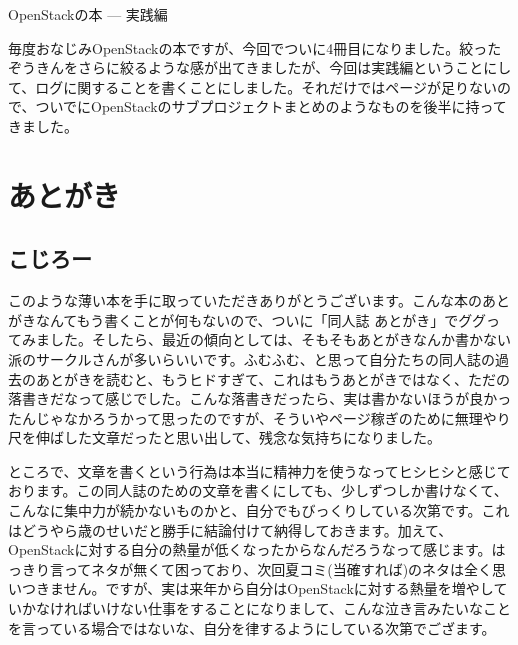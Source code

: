 \documentclass[10pt,b5paper,openany]{jsbook}
\begin{document}
{\Huge OpenStackの本 --- 実践編}

\vspace*{10mm}
\begin{minipage}{0.5\textwidth}
	{\scriptsize 毎度おなじみOpenStackの本ですが、今回でついに4冊目になりました。絞ったぞうきんをさらに絞るような感が出てきましたが、今回は実践編ということにして、ログに関することを書くことにしました。それだけではページが足りないので、ついでにOpenStackのサブプロジェクトまとめのようなものを後半に持ってきました。}
\end{minipage}

\vspace*{-1truein}
\begin{minipage}{\textwidth}
	\tableofcontents
\end{minipage}

\thispagestyle{empty}





\chapter{あとがき}

\section*{こじろー}
このような薄い本を手に取っていただきありがとうございます。こんな本のあとがきなんてもう書くことが何もないので、ついに「同人誌 あとがき」でググってみました。そしたら、最近の傾向としては、そもそもあとがきなんか書かない派のサークルさんが多いらいいです。ふむふむ、と思って自分たちの同人誌の過去のあとがきを読むと、もうヒドすぎて、これはもうあとがきではなく、ただの落書きだなって感じでした。こんな落書きだったら、実は書かないほうが良かったんじゃなかろうかって思ったのですが、そういやページ稼ぎのために無理やり尺を伸ばした文章だったと思い出して、残念な気持ちになりました。

ところで、文章を書くという行為は本当に精神力を使うなってヒシヒシと感じております。この同人誌のための文章を書くにしても、少しずつしか書けなくて、こんなに集中力が続かないものかと、自分でもびっくりしている次第です。これはどうやら歳のせいだと勝手に結論付けて納得しておきます。加えて、OpenStackに対する自分の熱量が低くなったからなんだろうなって感じます。はっきり言ってネタが無くて困っており、次回夏コミ(当確すれば)のネタは全く思いつきません。ですが、実は来年から自分はOpenStackに対する熱量を増やしていかなければいけない仕事をすることになりまして、こんな泣き言みたいなことを言っている場合ではないな、自分を律するようにしている次第でござます。
\end{document}
